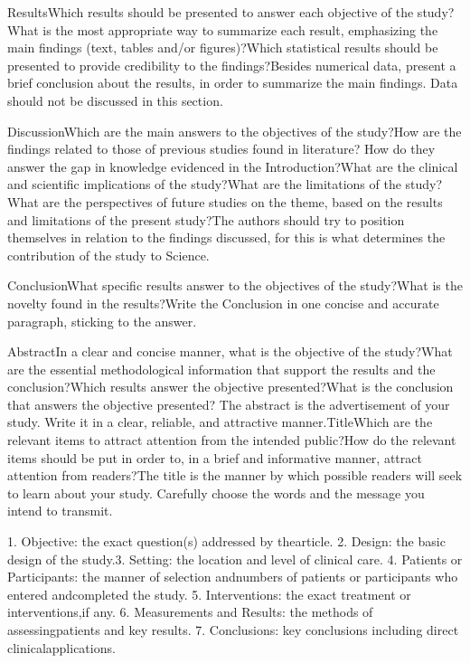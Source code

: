 ResultsWhich  results  should  be  presented  to  answer  each  objective  of  the study?What  is  the  most  appropriate  way  to  summarize  each  result,  emphasizing the main findings (text, tables and/or figures)?Which statistical results should be presented to provide credibility to the findings?Besides  numerical  data,  present  a  brief  conclusion  about  the  results, in order to summarize the main findings. Data should not be discussed in this section.

DiscussionWhich are the main answers to the objectives of the study?How are the findings related to those of previous studies found in literature? How do they answer the gap in knowledge evidenced in the Introduction?What are the clinical and scientific implications of the study?What are the limitations of the study?What are the perspectives of future studies on the theme, based on the results and limitations of the present study?The  authors  should  try  to  position  themselves  in  relation  to  the  findings discussed, for this is what determines the contribution of the study to Science.

ConclusionWhat specific results answer to the objectives of the study?What is the novelty found in the results?Write  the  Conclusion  in  one  concise  and  accurate  paragraph,  sticking to the answer. 

AbstractIn a clear and concise manner, what is the objective of the study?What are the essential methodological information that support the results and the conclusion?Which results answer the objective presented?What is the conclusion that answers the objective presented? The abstract is the advertisement of your study. Write it in a clear, reliable, and attractive manner.TitleWhich are the relevant items to attract attention from the intended public?How do the relevant items should be put in order to, in a brief and informative manner, attract attention from readers?The title is the manner by which possible readers will seek to learn about your study. Carefully choose the words and the message you intend to transmit. 

1. Objective:  the  exact  question(s)  addressed  by  thearticle.
2. Design: the basic design of the study.3. Setting: the location and level of clinical care.
4. Patients or Participants: the manner of selection andnumbers of patients or participants who entered andcompleted the study.
5. Interventions: the exact treatment or interventions,if any.
6. Measurements and Results: the methods of assessingpatients and key results.
7. Conclusions: key conclusions including direct clinicalapplications.

